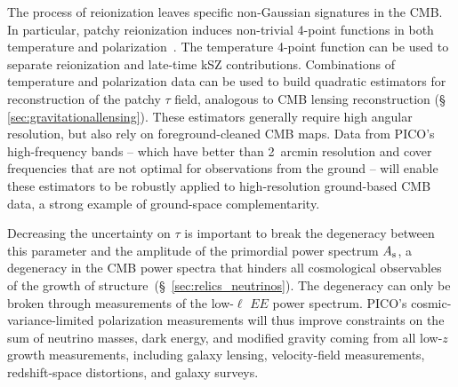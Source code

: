\documentclass[PICOReport.tex]{subfiles}
\begin{document}
The process of reionization leaves specific non-Gaussian signatures in the CMB.  In particular, patchy reionization induces non-trivial 4-point functions in both temperature and polarization~\citep{SmithFerraro2017,DvorkinSmith2009}.  The temperature 4-point function can be used to separate reionization and late-time kSZ contributions.  Combinations of temperature and polarization data can be used to build quadratic estimators for reconstruction of the patchy $\tau$ field, analogous to CMB lensing reconstruction (\S\,\ref{sec:gravitationallensing}).  These estimators generally require high angular resolution, but also rely on foreground-cleaned CMB maps. Data from PICO's high-frequency bands -- which have better than 2~arcmin resolution and cover frequencies that are not optimal for observations from the ground -- will enable these estimators to be robustly applied to high-resolution ground-based CMB data, a strong example of ground-space complementarity.  %
%


Decreasing the uncertainty on $\tau$ is important to break the degeneracy  between this parameter and the amplitude of the primordial power spectrum $A_{\rm s}$, a degeneracy in the CMB power spectra that hinders all cosmological observables of the growth of structure~(\S~\ref{sec:relics_neutrinos}). The degeneracy can only be broken through measurements of the low-$\ell$ $EE$ power spectrum. PICO's cosmic-variance-limited polarization measurements will thus improve constraints on the sum of neutrino masses, dark energy, and modified gravity coming from all low-$z$ growth measurements, including galaxy lensing, velocity-field measurements, redshift-space distortions, and galaxy surveys.
\end{document}
